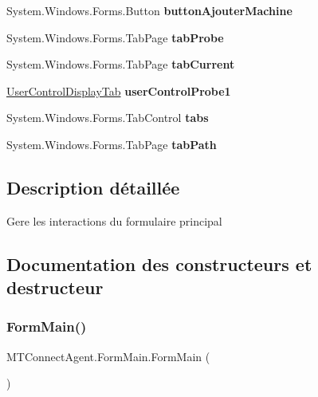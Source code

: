 \begin{DoxyCompactItemize}
System.\+Windows.\+Forms.\+Button {\bfseries button\+Ajouter\+Machine}
\item 
\mbox{\label{class_m_t_connect_agent_1_1_form_main_a75b27d8a3abec3df92d20d4154084624}} 
System.\+Windows.\+Forms.\+Tab\+Page {\bfseries tab\+Probe}
\item 
\mbox{\label{class_m_t_connect_agent_1_1_form_main_afb83c919c538512ec8043e3054520672}} 
System.\+Windows.\+Forms.\+Tab\+Page {\bfseries tab\+Current}
\item 
\mbox{\label{class_m_t_connect_agent_1_1_form_main_adec9b69cbb5d4fa32dac340367ca98fa}} 
\mbox{\hyperlink{class_m_t_connect_agent_1_1_user_control_display_tab}{User\+Control\+Display\+Tab}} {\bfseries user\+Control\+Probe1}
\item 
\mbox{\label{class_m_t_connect_agent_1_1_form_main_a21f2a3d788dd4fd47680fdc8b80a516f}} 
System.\+Windows.\+Forms.\+Tab\+Control {\bfseries tabs}
\item 
\mbox{\label{class_m_t_connect_agent_1_1_form_main_a732a9a6fd7aa0f69c764a1c7e75bf1fe}} 
System.\+Windows.\+Forms.\+Tab\+Page {\bfseries tab\+Path}
\end{DoxyCompactItemize}


\subsection{Description détaillée}
Gere les interactions du formulaire principal 



\subsection{Documentation des constructeurs et destructeur}
\mbox{\label{class_m_t_connect_agent_1_1_form_main_a13aab0ed9e05b8165e341ead37cb121e}} 
\subsubsection{\texorpdfstring{Form\+Main()}{FormMain()}}
{\footnotesize\ttfamily M\+T\+Connect\+Agent.\+Form\+Main.\+Form\+Main (\begin{DoxyParamCaption}{ }\end{DoxyParamCaption})\hspace{0.3cm}{\ttfamily [inline]}}



